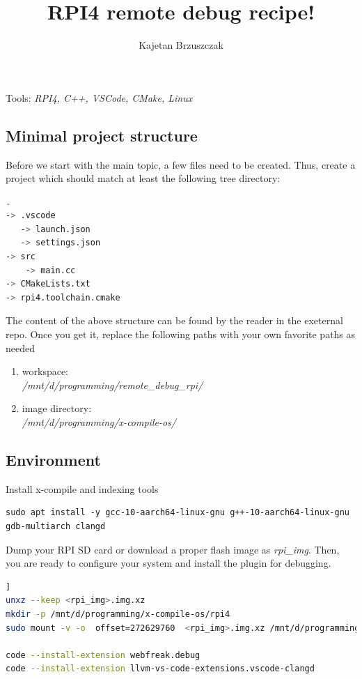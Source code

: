 \documentclass[twocolumn, 10pt]{article}
\title{RPI4 remote debug recipe!}
\author{Kajetan Brzuszczak}
\makeatletter
\renewcommand{\maketitle}{
\begin{flushleft}
{\noindent\Huge\bf\@title}\break
\end{flushleft}
}
\makeatother
\begin{document}
\maketitle

Tools: \textit{RPI4, C++, VSCode, CMake, Linux}

\subsection*{Minimal project structure}
\normalsize

Before we start with the main topic, a few files need to be created.
Thus, create a project which should match at least the following tree directory:
\begin{lstlisting}[language=sh,caption={},backgroundcolor=\color{gray!10}]
.
-> .vscode
   -> launch.json
   -> settings.json
-> src
    -> main.cc
-> CMakeLists.txt
-> rpi4.toolchain.cmake
\end{lstlisting}

The content of the above structure can be found by the reader in the exeternal repo\cite{bib:example}.
Once you get it, replace the following paths with your own favorite paths as needed
\begin{enumerate}
  \item workspace: \\
        \textit{/mnt/d/programming/remote\_debug\_rpi/}
  \item image directory: \\
        \textit{/mnt/d/programming/x-compile-os/}
\end{enumerate}

\subsection*{Environment}
Install x-compile and indexing tools
\begin{lstlisting}[backgroundcolor=\color{gray!10},caption={}]
sudo apt install -y gcc-10-aarch64-linux-gnu g++-10-aarch64-linux-gnu gdb-multiarch clangd
\end{lstlisting}

Dump your RPI SD card or download a proper flash image\cite{bib:rpi-images} as \textit{rpi\_img}.
Then, you are ready to configure your system and install the plugin for debugging.

\begin{lstlisting}[language=sh,backgroundcolor=\color{gray!10},breaklines=true,escapechar=|,caption={}]]
unxz --keep <rpi_img>.img.xz
mkdir -p /mnt/d/programming/x-compile-os/rpi4
sudo mount -v -o  offset=272629760  <rpi_img>.img.xz /mnt/d/programming/x-compile-os/rpi4

code --install-extension webfreak.debug
code --install-extension llvm-vs-code-extensions.vscode-clangd
\end{lstlisting}
\end{document}
